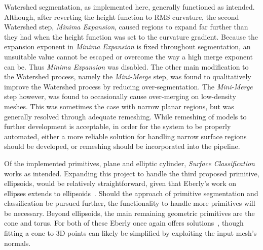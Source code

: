 Watershed segmentation, as implemented here, generally functioned as intended.
Although, after reverting the height function to RMS curvature, the second Watershed step, \textit{Minima Expansion}, caused regions to expand far further than they had when the height function was set to the curvature gradient.
Because the expansion exponent in \textit{Minima Expansion} is fixed throughout segmentation, an unsuitable value cannot be escaped or overcome the way a high merge exponent can be.
Thus \textit{Minima Expansion} was disabled.
The other main modification to the Watershed process, namely the \textit{Mini-Merge} step, was found to qualitatively improve the Watershed process by reducing over-segmentation.
The \textit{Mini-Merge} step however, was found to occasionally cause over-merging on low-density meshes.
This was sometimes the case with narrow planar regions, but was generally resolved through adequate remeshing.
While remeshing of models to further development is acceptable, in order for the system to be properly automated, either a more reliable solution for handling narrow surface regions should be developed, or remeshing should be incorporated into the pipeline.

Of the implemented primitives, plane and elliptic cylinder, \textit{Surface Classification} works as intended.
Expanding this project to handle the third proposed primitive, ellipsoids, would be relatively straightforward, given that Eberly's work on ellipses extends to ellipsoids~\cite{GeoTools_pt_to_ellipse}.
Should the approach of primitive segmentation and classification be pursued further, the functionality to handle more primitives will be necessary.
Beyond ellipsoids, the main remaining geometric primitives are the cone and torus.
For both of these Eberly once again offers solutions~\cite{GeoTools_least_squares_fitting}, though fitting a cone to 3D points can likely be simplified by exploiting the input mesh's normals.

